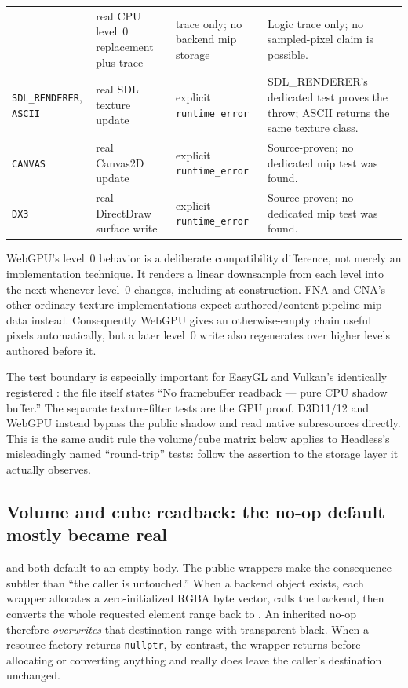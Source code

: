 \begin{longtable}{@{}p{}p{}p{}p{}@{}}
  & real CPU level~0 replacement plus trace & trace only; no backend mip storage
  & Logic trace only; no sampled-pixel claim is possible. \\
\texttt{SDL\_RENDERER}, \texttt{ASCII}
  & real SDL texture update & explicit \texttt{runtime\_error}
  & SDL\_RENDERER's dedicated test proves the throw; ASCII returns the same texture class. \\
\texttt{CANVAS}
  & real Canvas2D update & explicit \texttt{runtime\_error}
  & Source-proven; no dedicated mip test was found. \\
\texttt{DX3}
  & real DirectDraw surface write & explicit \texttt{runtime\_error}
  & Source-proven; no dedicated mip test was found. \\
\bottomrule
\end{longtable}
\endgroup

WebGPU's level~0 behavior is a deliberate compatibility difference, not merely an
implementation technique. It renders a linear downsample from each level into the next
whenever level~0 changes, including at construction. FNA and CNA's other ordinary-texture
implementations expect authored/content-pipeline mip data instead. Consequently WebGPU gives
an otherwise-empty chain useful pixels automatically, but a later level~0 write also
regenerates over higher levels authored before it.

The test boundary is especially important for EasyGL and Vulkan's identically registered
: the file itself states ``No framebuffer readback ---
pure CPU shadow buffer.'' The separate texture-filter tests are the GPU proof. D3D11/12 and
WebGPU instead bypass the public shadow and read native subresources directly. This is the
same audit rule the volume/cube matrix below applies to Headless's misleadingly named
``round-trip'' tests: follow the assertion to the storage layer it actually observes.

\subsection{Volume and cube readback: the no-op default mostly became real}
\label{sec:texture-volume-readback-matrix}

 and
 both default to an empty body. The public wrappers
make the consequence subtler than ``the caller is untouched.'' When a backend object exists,
each wrapper allocates a zero-initialized RGBA byte vector, calls the backend, then converts
the whole requested element range back to . An inherited no-op therefore
\emph{overwrites} that destination range with transparent black. When a resource factory
returns \texttt{nullptr}, by contrast, the wrapper returns before allocating or converting
anything and really does leave the caller's destination unchanged.

